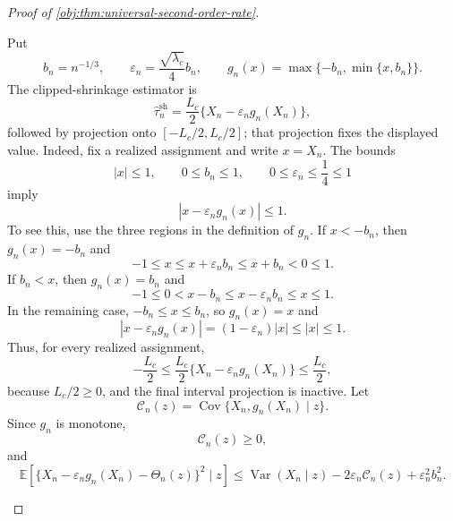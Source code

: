 \begin{proof}[Proof of \cref{obj:thm:universal-second-order-rate}]
\begin{enumerate}
Put
\[
b_n=n^{-1/3},
\qquad
\varepsilon_n=\frac{\sqrt{\lambda_c}}4 b_n,
\qquad
g_n(x)=\max\{-b_n,\min\{x,b_n\}\}.
\]
The clipped-shrinkage estimator is
\[
\widehat\tau_n^{\mathrm{sh}}
=
\frac{L_c}{2}\{X_n-\varepsilon_n g_n(X_n)\},
\]
followed by projection onto \([-L_c/2,L_c/2]\); that projection fixes the displayed value. Indeed, fix a realized assignment and write \(x=X_n\). The bounds
\[
|x|\le 1,\qquad 0\le b_n\le 1,\qquad 0\le\varepsilon_n\le \frac14\le 1
\]
imply
\[
|x-\varepsilon_n g_n(x)|\le 1.
\]
To see this, use the three regions in the definition of \(g_n\). If \(x<-b_n\), then \(g_n(x)=-b_n\) and
\[
-1\le x\le x+\varepsilon_n b_n\le x+b_n<0\le 1.
\]
If \(b_n<x\), then \(g_n(x)=b_n\) and
\[
-1\le 0<x-b_n\le x-\varepsilon_n b_n\le x\le 1.
\]
In the remaining case, \(-b_n\le x\le b_n\), so \(g_n(x)=x\) and
\[
|x-\varepsilon_n g_n(x)|=(1-\varepsilon_n)|x|\le |x|\le 1.
\]
Thus, for every realized assignment,
\[
-\frac{L_c}{2}
\le
\frac{L_c}{2}\{X_n-\varepsilon_n g_n(X_n)\}
\le
\frac{L_c}{2},
\]
because \(L_c/2\ge0\), and the final interval projection is inactive.
Let
\[
\mathcal C_n(z)=\operatorname{Cov}\{X_n,g_n(X_n)\mid z\}.
\]
Since \(g_n\) is monotone,
\[
\mathcal C_n(z)\ge 0,
\]
and
\[
\mathbb E\!\left[\{X_n-\varepsilon_n g_n(X_n)-\Theta_n(z)\}^2\mid z\right]
\le
\operatorname{Var}(X_n\mid z)-2\varepsilon_n\mathcal C_n(z)+\varepsilon_n^2b_n^2 .
\]


\end{enumerate}
\end{proof}
